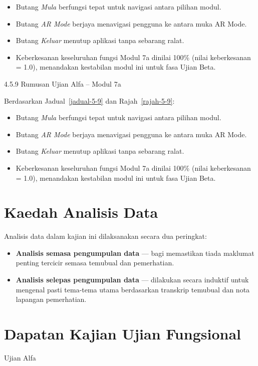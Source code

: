 {{\begin{itemize}[h]
  \item Butang \textit{Mula} berfungsi tepat untuk navigasi antara pilihan modul.
  \item Butang \textit{AR Mode} berjaya menavigasi pengguna ke antara muka AR Mode.
  \item Butang \textit{Keluar} menutup aplikasi tanpa sebarang ralat.
  \item Keberkesanan keseluruhan fungsi Modul 7a dinilai 100\% (nilai keberkesanan = 1.0), menandakan kestabilan modul ini untuk fasa Ujian Beta.
\end{itemize}
4.5.9 Rumusan Ujian Alfa – Modul 7a

Berdasarkan Jadual~\ref{jadual-5-9} dan Rajah~\ref{rajah-5-9}:

\begin{itemize}[h]
  \item Butang \textit{Mula} berfungsi tepat untuk navigasi antara pilihan modul.
  \item Butang \textit{AR Mode} berjaya menavigasi pengguna ke antara muka AR Mode.
  \item Butang \textit{Keluar} menutup aplikasi tanpa sebarang ralat.
  \item Keberkesanan keseluruhan fungsi Modul 7a dinilai 100\% (nilai keberkesanan = 1.0), menandakan kestabilan modul ini untuk fasa Ujian Beta.
\end{itemize}

\clearpage


\section{Kaedah Analisis Data}
Analisis data dalam kajian ini dilaksanakan secara dua peringkat:

\begin{itemize}
    \item \textbf{Analisis semasa pengumpulan data} — bagi memastikan tiada maklumat penting tercicir semasa temubual dan pemerhatian.
    \item \textbf{Analisis selepas pengumpulan data} — dilakukan secara induktif untuk mengenal pasti tema-tema utama berdasarkan transkrip temubual dan nota lapangan pemerhatian.
\end{itemize}
\section{Dapatan Kajian Ujian Fungsional }
Ujian Alfa

}}
